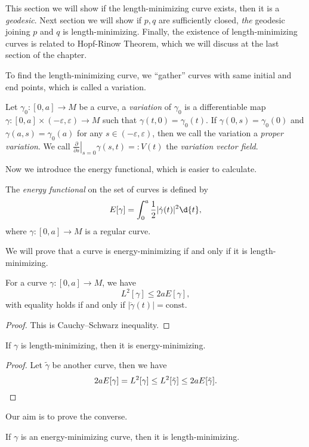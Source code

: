 This section we will show if the length-minimizing curve exists, then it is a \emph{geodesic}.
Next section we will show if $p,q$ are sufficiently closed, \emph{the} geodesic joining $p$ and $q$ is length-minimizing.
Finally, the existence of length-minimizing curves is related to Hopf-Rinow Theorem, which we will discuss at the last section of the chapter.

To find the length-minimizing curve, we ``gather'' curves with same initial and end points, which is called a variation.
\begin{defn}
    Let $\gamma_0:[0,a]\to M$ be a curve, a \emph{variation} of $\gamma_0$ is a differentiable map $\gamma:[0,a]\times(-\varepsilon,\varepsilon)\to M$ such that $\gamma(t,0)=\gamma_0(t)$.
    If $\gamma(0,s)=\gamma_0(0)$ and $\gamma(a,s)=\gamma_0(a)$ for any $s\in(-\varepsilon,\varepsilon)$, then we call the variation a \emph{proper variation}.
    We call $\left.\frac{\partial{}}{\partial{s}}\right|_{s=0}\gamma(s,t)=:V(t)$ the \emph{variation vector field}.
\end{defn}

Now we introduce the energy functional, which is easier to calculate.
\begin{defn}
    The \emph{energy functional} on the set of curves is defined by
    \[E[\gamma]=\int_0^a\frac{1}{2}|\dot{\gamma}(t)|^2\d{t},\]
    where $\gamma:[0,a]\to M$ is a regular curve.
\end{defn}

We will prove that a curve is energy-minimizing if and only if it is length-minimizing.
\begin{lem}
    For a curve $\gamma:[0,a]\to M$, we have
    \[L^2[\gamma]\leq 2aE[\gamma],\]
    with equality holds if and only if $|\dot\gamma(t)|=\mathrm{const}$.
\end{lem}
\begin{proof}
    This is Cauchy--Schwarz inequality.
\end{proof}

\begin{prop}\label{length-min to energy-min}
    If $\gamma$ is length-minimizing, then it is energy-minimizing.
\end{prop}
\begin{proof}
    Let $\tilde\gamma$ be another curve, then we have
    \[2aE[\gamma]=L^2[\gamma]\leq L^2[\tilde\gamma]\leq 2aE[\tilde\gamma].\qedhere\]
\end{proof}

Our aim is to prove the converse.
\begin{prop}\label{energy-min to length-min}
    If $\gamma$ is an energy-minimizing curve, then it is length-minimizing.
\end{prop}

